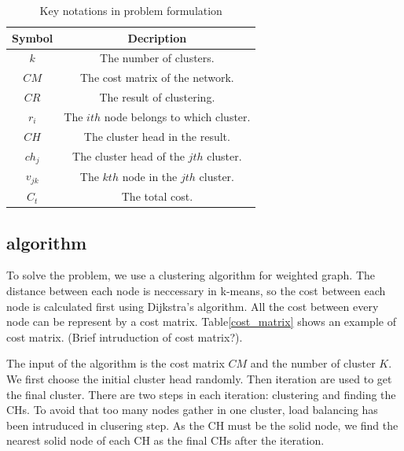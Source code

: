 \documentclass[conference]{IEEEtran}
\begin{document}
\begin{table}[htbp]
\centering
\begin{tabular}{|c||c|}
\hline
Symbol & Decription\\
\hline
$k$ & The number of clusters.\\
\hline
$CM$ & The cost matrix of the network.\\
\hline
$CR$ & The result of clustering.\\
\hline
$r_i$ & The $ith$ node belongs to which cluster.\\
\hline
$CH$ & The cluster head in the result.\\
\hline
$ch_j$ & The cluster head of the $jth$ cluster.\\
\hline
$v_{jk}$ & The $kth$ node in the $jth$ cluster.\\
\hline
$C_t$ & The total cost.\\
\hline
\end{tabular}
\caption{Key notations in problem formulation}
\label{notations}
\end{table} 

\subsection{algorithm}

To solve the problem, we use a clustering algorithm for weighted graph. The distance between each node is neccessary in k-means, so the cost between each node is calculated first using Dijkstra's algorithm. All the cost between every node can be represent by a cost matrix. Table\ref{cost_matrix} shows an example of cost matrix. (Brief intruduction of cost matrix?).

The input of the algorithm is the cost matrix $CM$ and the number of cluster $K$. We first choose the initial cluster head randomly. Then iteration are used to get the final cluster. There are two steps in each iteration: clustering and finding the CHs. To avoid that too many nodes gather in one cluster, load balancing has been intruduced in clusering step. As the CH must be the solid node, we find the nearest solid node of each CH as the final CHs after the iteration.
\end{document}
